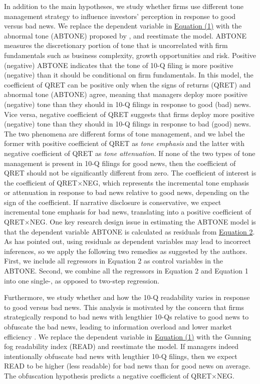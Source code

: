 \documentclass[a4paper]{article}
\begin{document}
\begin{spacing}{2}
In addition to the main hypotheses, we study whether firms use different tone management strategy to influence investors' perception in response to good versus bad news. We replace the dependent variable in \hyperref[eq1]{Equation (1)} with the abnormal tone (ABTONE) proposed by , and reestimate the model. ABTONE measures the discretionary portion of tone that is uncorrelated with firm fundamentals such as business complexity, growth opportunities and risk. Positive (negative) ABTONE indicates that the tone of 10-Q filing is more positive (negative) than it should be conditional on firm fundamentals. In this model, the coefficient of QRET can be positive only when the signs of returns (QRET) and abnormal tone (ABTONE) agree, meaning that managers deploy more positive (negative) tone than they should in 10-Q filings in response to good (bad) news. Vice versa, negative coefficient of QRET suggests that firms deploy more positive (negative) tone than they should in 10-Q filings in response to bad (good) news. The two phenomena are different forms of tone management, and we label the former with positive coefficient of QRET as \textit{tone emphasis} and the latter with negative coefficient of QRET as \textit{tone attenuation}. If none of the two types of tone management is present in 10-Q filings for good news, then the coefficient of QRET should not be significantly different from zero. The coefficient of interest is the coefficient of QRET$\times$NEG, which represents the incremental tone emphasis or attenuation in response to bad news relative to good news, depending on the sign of the coefficient. If narrative disclosure is conservative, we expect incremental tone emphasis for bad news, translating into a positive coefficient of QRET$\times$NEG. One key research design issue in estimating the ABTONE model is that the dependent variable ABTONE is calculated as residuals from \hyperref[eq2]{Equation 2}. As  has pointed out, using residuals as dependent variables may lead to incorrect inferences, so we apply the following two remedies as suggested by the authors. First, we include all regressors in Equation 2 as control variables in the ABTONE. Second, we combine all the regressors in Equation 2 and Equation 1 into one single-, as opposed to two-step regression.

Furthermore, we study whether and how the 10-Q readability varies in response to good versus bad news. This analysis is motivated by the concern that firms strategically respond to bad news with lengthier 10-Qs relative to good news to obfuscate the bad news, leading to information overload and lower market efficiency \cite{chapmanInformationOverloadDisclosure2019}. We replace the dependent variable in \hyperref[eq1]{Equation (1)} with the Gunning fog readability index (READ) and reestimate the model. If managers indeed intentionally obfuscate bad news with lengthier 10-Q filings, then we expect READ to be higher (less readable) for bad news than for good news on average. The obfuscation hypothesis predicts a negative coefficient of QRET$\times$NEG. 


\end{spacing}
\end{document}
